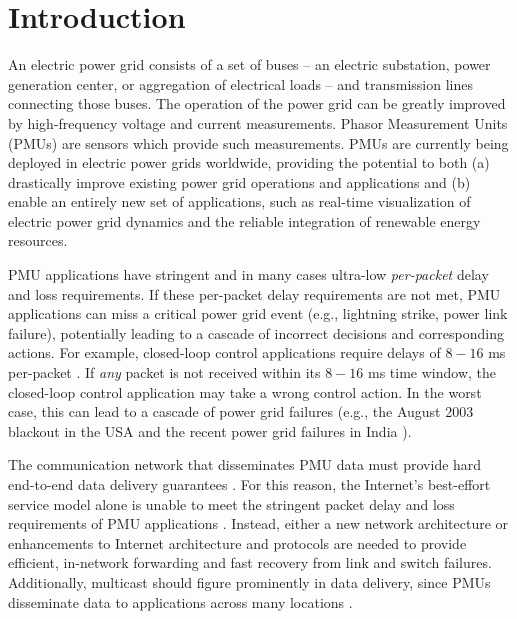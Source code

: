 




\section{Introduction}
\label{sec:intro}


An electric power grid consists of a set of buses  -- an electric substation, power generation center, or aggregation of electrical loads -- and transmission lines connecting those buses.
The operation of the power grid can be greatly improved by high-frequency voltage and current measurements. Phasor Measurement Units (PMUs) are  
sensors which provide such measurements. PMUs are currently being deployed in electric power grids worldwide, providing the potential to both 
(a) drastically improve existing power grid operations and applications and (b) enable an entirely new set of applications,
such as real-time visualization of electric power grid dynamics and the reliable integration of renewable energy resources. 

PMU applications have stringent and in many cases ultra-low \emph{per-packet} delay and loss requirements.  
If these per-packet delay requirements are not met, PMU applications can miss a critical power grid event (e.g., lightning strike, power link failure), potentially leading to a 
cascade of incorrect decisions and corresponding actions. For example, closed-loop control applications require delays of $8-16$ ms per-packet \cite{Bakken11}. 
If \emph{any} packet is not received within its $8-16$ ms time window, the closed-loop control application may take a wrong control action.
In the worst case, this can lead to a cascade of power grid failures (e.g., the August 2003 blackout in the USA \cite{??} and the recent power grid failures in India \cite{??}). 


The communication network that disseminates PMU data must provide hard end-to-end data delivery guarantees \cite{Bakken11}. 
For this reason, the Internet's best-effort service model alone is unable to meet the stringent packet delay and loss requirements of PMU applications \cite{Birman05}. 
Instead, either a new network architecture or enhancements to Internet architecture and protocols are needed \cite{Bakken11,Birman05,Naspi10,Hopkinson09} to provide efficient, in-network forwarding and fast recovery from link and switch failures. 
Additionally, multicast should figure prominently in data  delivery, since PMUs disseminate  data  to applications across many locations \cite{Bakken11}.

